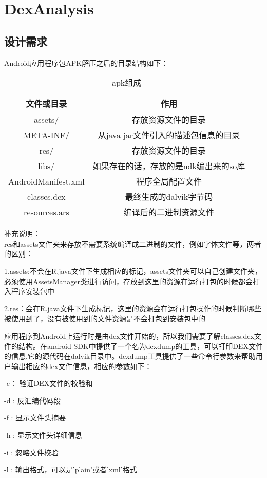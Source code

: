 \section{DexAnalysis}
\subsection{设计需求}
Android应用程序包APK解压之后的目录结构如下：
\begin{table}[htbp]
\centering
\caption{\label{apk}apk组成}
\begin{tabular}{|c|c|}
\hline
文件或目录 & 作用\\
\hline
assets/ & 存放资源文件的目录\\
\hline
META-INF/ & 从java jar文件引入的描述包信息的目录\\
\hline
res/ & 存放资源文件的目录\\
\hline
libs/ & 如果存在的话，存放的是ndk编出来的so库\\
\hline
AndroidManifest.xml & 程序全局配置文件\\
\hline
classes.dex & 最终生成的dalvik字节码\\
\hline
resources.ars & 编译后的二进制资源文件\\
\hline
\end{tabular}
\end{table}

补充说明：\\
res和assets文件夹来存放不需要系统编译成二进制的文件，例如字体文件等，两者的区别：

1.assets:不会在R.java文件下生成相应的标记，assets文件夹可以自己创建文件夹，必须使用AssetsManager类进行访问，存放到这里的资源在运行打包的时候都会打入程序安装包中

2.res：会在R.java文件下生成标记，这里的资源会在运行打包操作的时候判断哪些被使用到了，没有被使用到的文件资源是不会打包到安装包中的

应用程序到Android上运行时是由dex文件开始的，所以我们需要了解classes.dex文件的结构。在android SDK中提供了一个名为dexdump的工具，可以打印DEX文件的信息,它的源代码在dalvik目录中。dexdump工具提供了一些命令行参数来帮助用户输出相应的dex文件信息，相应的参数如下：

-c： 验证DEX文件的校验和

-d :  反汇编代码段

-f : 显示文件头摘要

-h : 显示文件头详细信息

-i : 忽略文件校验

-l : 输出格式，可以是'plain'或者'xml'格式

